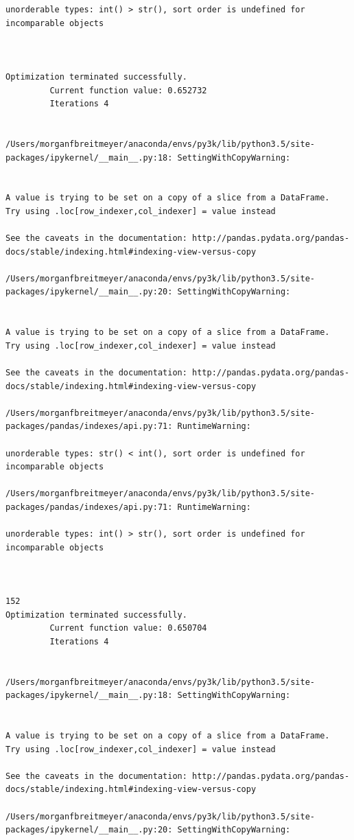 \begin{lstlisting}
unorderable types: int() > str(), sort order is undefined for incomparable objects



Optimization terminated successfully.
         Current function value: 0.652732
         Iterations 4


/Users/morganfbreitmeyer/anaconda/envs/py3k/lib/python3.5/site-packages/ipykernel/__main__.py:18: SettingWithCopyWarning:


A value is trying to be set on a copy of a slice from a DataFrame.
Try using .loc[row_indexer,col_indexer] = value instead

See the caveats in the documentation: http://pandas.pydata.org/pandas-docs/stable/indexing.html#indexing-view-versus-copy

/Users/morganfbreitmeyer/anaconda/envs/py3k/lib/python3.5/site-packages/ipykernel/__main__.py:20: SettingWithCopyWarning:


A value is trying to be set on a copy of a slice from a DataFrame.
Try using .loc[row_indexer,col_indexer] = value instead

See the caveats in the documentation: http://pandas.pydata.org/pandas-docs/stable/indexing.html#indexing-view-versus-copy

/Users/morganfbreitmeyer/anaconda/envs/py3k/lib/python3.5/site-packages/pandas/indexes/api.py:71: RuntimeWarning:

unorderable types: str() < int(), sort order is undefined for incomparable objects

/Users/morganfbreitmeyer/anaconda/envs/py3k/lib/python3.5/site-packages/pandas/indexes/api.py:71: RuntimeWarning:

unorderable types: int() > str(), sort order is undefined for incomparable objects



152
Optimization terminated successfully.
         Current function value: 0.650704
         Iterations 4


/Users/morganfbreitmeyer/anaconda/envs/py3k/lib/python3.5/site-packages/ipykernel/__main__.py:18: SettingWithCopyWarning:


A value is trying to be set on a copy of a slice from a DataFrame.
Try using .loc[row_indexer,col_indexer] = value instead

See the caveats in the documentation: http://pandas.pydata.org/pandas-docs/stable/indexing.html#indexing-view-versus-copy

/Users/morganfbreitmeyer/anaconda/envs/py3k/lib/python3.5/site-packages/ipykernel/__main__.py:20: SettingWithCopyWarning:



\end{lstlisting}
